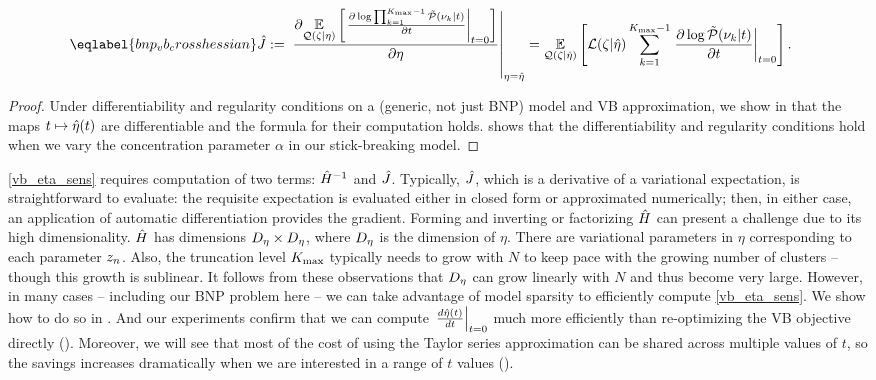 \begin{thm}
\begin{align}
%
\eqlabel{bnp_vb_crosshessian}
\crosshessian :={}&
   \fracat{\partial
           \expect{\q(\zeta \vert \eta)}
                  {\fracat{\partial \log \prod_{k=1}^{\kmax -1}\ptil(\nu_k \vert \t)}
                          {\partial \t}{\t=0} }
           }
       {\partial \eta}{\eta = \etaopt} %
={}
    \expect{\q(\zeta \vert \etaopt)}{
          \lqgradbar{\zeta \vert \etaopt}
          \sum_{k=1}^{\kmax-1}
          \fracat{\partial \log \ptil(\nu_k \vert \t)}
                 {\partial \t}{\t=0}}.
%
\end{align}
%
%
\end{thm}
%
\begin{proof}
%
Under differentiability and regularity conditions on a (generic, not just BNP)
model and VB approximation, we show in  that the maps $t
\mapsto \hat\eta(t)$ are differentiable and the formula for their computation
holds.  shows that the differentiability and
regularity conditions hold when we vary the concentration parameter $\alpha$ in
our stick-breaking model.
%
\end{proof}
%

\eqref{vb_eta_sens} requires computation of two terms: $\hat{H}^{-1}$ and
$\hat J$.  Typically, $\hat J$, which is a derivative of a
variational expectation, is straightforward to evaluate: the requisite
expectation is evaluated either in closed form or approximated numerically;
then, in either case, an application of automatic differentiation provides the
gradient. Forming and inverting or factorizing $\hat{H}$ can present a
challenge due to its high dimensionality. $\hat{H}$ has dimensions ${D_{\eta}}
\times {D_{\eta}}$, where ${D_{\eta}}$ is the dimension of $\eta$. There are
variational parameters in $\eta$ corresponding to each parameter $z_n$. Also,
the truncation level ${K_{\mathrm{max}}}$ typically needs to grow with $N$ to keep pace with
the growing number of clusters -- though this growth is sublinear. It follows
from these observations that ${D_{\eta}}$ can grow linearly with $N$ and thus
become very large.  However, in many cases -- including our BNP problem here --
we can take advantage of model sparsity to efficiently compute
\eqref{vb_eta_sens}. We show how to do so in . And
our experiments confirm that we can compute $\left.\frac{d \hat\eta(t)}{d t}\right\vert_{t=0}$
much more efficiently than re-optimizing the VB objective directly
(). Moreover, we will see that most of the cost of using
the Taylor series approximation can be shared across multiple values of $t$, so
the savings increases dramatically when we are interested in a range of $t$
values ().

